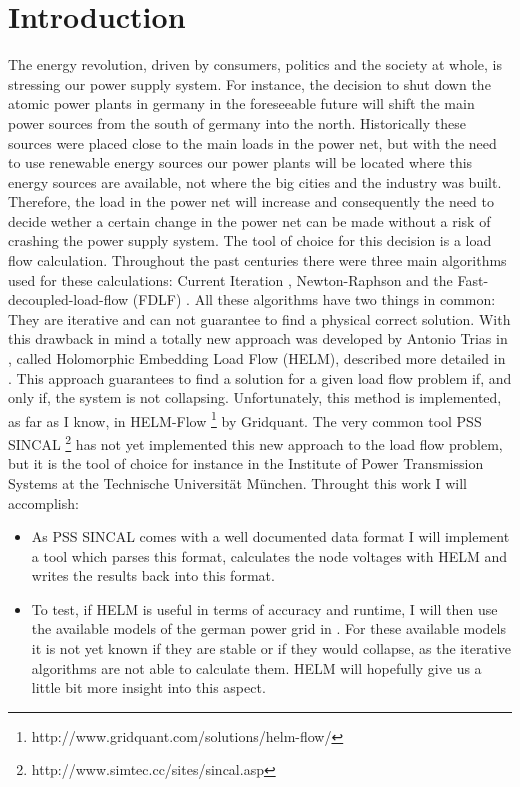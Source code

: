 \chapter{Introduction}
The energy revolution, driven by consumers, politics and the society at whole, is stressing our power supply system. For instance, the decision to shut down the atomic power plants in germany in the foreseeable future will shift the main power sources from the south of germany into the north. Historically these sources were placed close to the main loads in the power net, but with the need to use renewable energy sources our power plants will be located where this energy sources are available, not where the big cities and the industry was built. Therefore, the load in the power net will increase and consequently the need to decide wether a certain change in the power net can be made without a risk of crashing the power supply system.
The tool of choice for this decision is a load flow calculation. Throughout the past centuries there were three main algorithms used for these calculations: Current Iteration , Newton-Raphson  and the Fast-decoupled-load-flow (FDLF) . All these algorithms have two things in common: They are iterative and can not guarantee to find a physical correct solution. With this drawback in mind a totally new approach was developed by Antonio Trias in \cite{helmIEEE}, called Holomorphic Embedding Load Flow (HELM), described more detailed in . This approach guarantees to find a solution for a given load flow problem if, and only if, the system is not collapsing. Unfortunately, this method is implemented, as far as I know, in HELM-Flow \footnote{http://www.gridquant.com/solutions/helm-flow/} by Gridquant. The very common tool PSS SINCAL \footnote{http://www.simtec.cc/sites/sincal.asp} has not yet implemented this new approach to the load flow problem, but it is the tool of choice for instance in the Institute of Power Transmission Systems at the Technische Universität München. Throught this work I will accomplish:
\begin{itemize}
	\item As PSS SINCAL comes with a well documented data format I will implement a tool which parses this format, calculates the node voltages with HELM and writes the results back into this format. 
	\item To test, if HELM is useful in terms of accuracy and runtime, I will then use the available models of the german power grid in . For these available models it is not yet known if they are stable or if they would collapse, as the iterative algorithms are not able to calculate them. HELM will hopefully give us a little bit more insight into this aspect.
\end{itemize}